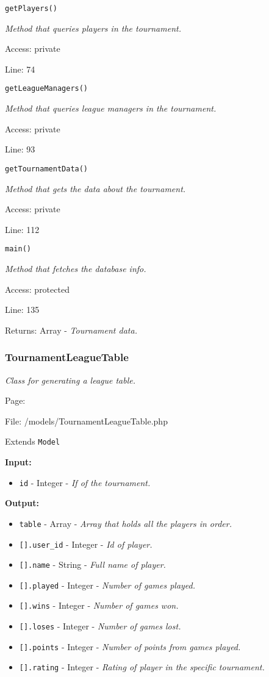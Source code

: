 \texttt{getPlayers()}

{\scriptsize
\textit{Method that queries players in the tournament.}

Access: private

Line: 74

}

\texttt{getLeagueManagers()}

{\scriptsize
\textit{Method that queries league managers in the tournament.}

Access: private

Line: 93

}

\texttt{getTournamentData()}

{\scriptsize
\textit{Method that gets the data about the tournament.}

Access: private

Line: 112

}

\texttt{main()}

{\scriptsize
\textit{Method that fetches the database info.}

Access: protected

Line: 135

Returns: Array - \textit{Tournament data.}

}

\subsubsection{TournamentLeagueTable}\label{TournamentLeagueTable.php.doc}
\textit{Class for generating a league table.}

Page: \pageref{TournamentLeagueTable.php}

File: /models/TournamentLeagueTable.php

Extends \texttt{Model}

\textbf{Input:}
\begin{itemize}
\item \texttt{id} - Integer - \textit{If of the tournament.}
\end{itemize}

\textbf{Output:}
\begin{itemize}
\item \texttt{table} - Array - \textit{Array that holds all the players in order.}
\item \texttt{[].user\_id} - Integer - \textit{Id of player.}
\item \texttt{[].name} - String - \textit{Full name of player.}
\item \texttt{[].played} - Integer - \textit{Number of games played.}
\item \texttt{[].wins} - Integer - \textit{Number of games won.}
\item \texttt{[].loses} - Integer - \textit{Number of games lost.}
\item \texttt{[].points} - Integer - \textit{Number of points from games played.}
\item \texttt{[].rating} - Integer - \textit{Rating of player in the specific tournament.}
\end{itemize}

